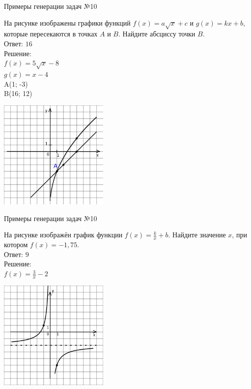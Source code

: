 \documentclass[aspectratio=169]{beamer}
\begin{document}
\begin{frame}{Примеры генерации задач №10}
    \begin{multicols}{2}
          
        На рисунке изображены графики функций $f(x)=a\sqrt{x}+c$ и $g(x)=kx+b$, которые пересекаются в точках $A$ и $B$. Найдите абсциссу точки $B$.\\
        
        Ответ: $16$\\

        Решение: \\
        $f(x)=5\sqrt{x}-8$\\
        $g(x)=x-4$\\
        A(1; -3)\\
        B(16; 12)


        \includegraphics[width=0.4\textwidth]{images/230486231093499n0}
    \end{multicols}
         
\end{frame}

\begin{frame}{Примеры генерации задач №10}
    \begin{multicols}{2}
        На рисунке изображён график функции $f(x)=\frac{k}{x}+b$. Найдите значение $x$, при котором $f(x)=-1,75$.\\

        Ответ: $9$\\

        Решение: \\
        $f(x)=\frac{3}{x}-2$

        \includegraphics[width=0.4\textwidth]{images/5535657652049n0.png}
    \end{multicols}
    
\end{frame}
\end{document}
